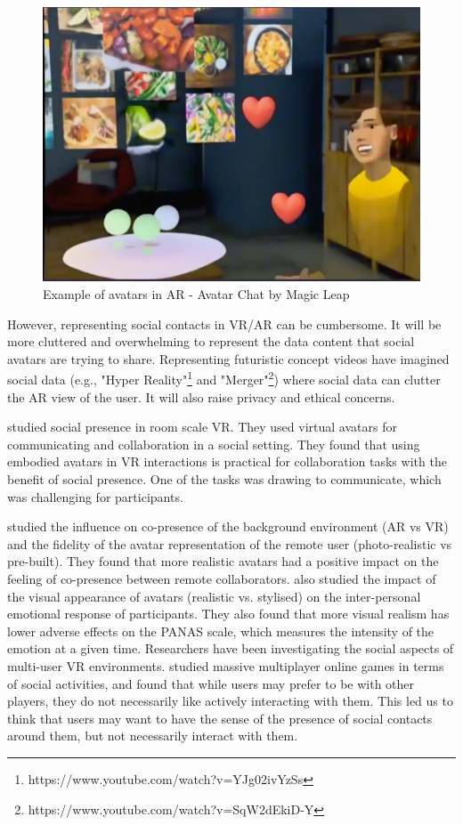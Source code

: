 \begin{figure}
    \centering
    \includegraphics[width=0.8\linewidth]{images/avatar-chat-1.png}
    \caption{Example of avatars in AR - Avatar Chat by Magic Leap}
    \label{fig:ml-avatar-chat-2}
\end{figure}

However, representing social contacts in VR/AR can be cumbersome. It will be more cluttered and overwhelming to represent the data content that social avatars are trying to share. Representing futuristic concept videos have imagined social data (e.g., "Hyper Reality"\footnote{https://www.youtube.com/watch?v=YJg02ivYzSs} and "Merger"\footnote{https://www.youtube.com/watch?v=SqW2dEkiD-Y}) where social data can clutter the AR view of the user. It will also raise privacy and ethical concerns.

\textcite{Greenwald2017} studied social presence in room scale VR. They used virtual avatars for communicating and collaboration in a social setting. They found that using embodied avatars in VR interactions is practical for collaboration tasks with the benefit of social presence. One of the tasks was drawing to communicate, which was challenging for participants. 

\textcite{Jo2016} studied the influence on co-presence of the background environment (AR vs VR) and the fidelity of the avatar representation of the remote user (photo-realistic vs pre-built). They found that more realistic avatars had a positive impact on the feeling of co-presence between remote collaborators. \textcite{Volante2016} also studied the impact of the visual appearance of avatars (realistic vs. stylised) on the inter-personal emotional response of participants. They also found that more visual realism has lower adverse effects on the PANAS scale, which measures the intensity of the emotion at a given time. Researchers have been investigating the social aspects of multi-user VR environments. \textcite{Ducheneaut2006} studied massive multiplayer online games in terms of social activities, and found that while users may prefer to be with other players, they do not necessarily like actively interacting with them. This led us to think that users may want to have the sense of the presence of social contacts around them, but not necessarily interact with them.

